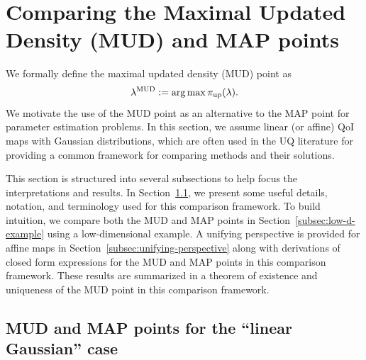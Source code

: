 \section{Comparing the Maximal Updated Density (MUD) and MAP points}\label{sec:estimation}

We formally define the maximal updated density (MUD) point as
\begin{equation}\label{eq:mudpt_inital_defn}
	\lambda^{\text{MUD}} := \operatorname*{arg\,max} {\operatorname*{\pi_{up}}}(\lambda).
\end{equation}
We motivate the use of the MUD point as an alternative to the MAP point for parameter estimation problems.
In this section, we assume linear (or affine) QoI maps with Gaussian distributions, which are often used in the UQ literature for providing a common framework for comparing methods and their solutions.

This section is structured into several subsections to help focus the interpretations and results.
In Section~\ref{subsec:Motivation}, we present some useful details, notation, and terminology used for this comparison framework.
To build intuition, we compare both the MUD and MAP points in Section~\ref{subsec:low-d-example} using a low-dimensional example.
A unifying perspective is provided for affine maps in Section~\ref{subsec:unifying-perspective} along with derivations of closed form expressions for the MUD and MAP points in this comparison framework.
These results are summarized in a theorem of existence and uniqueness of the MUD point in this comparison framework.


\subsection{MUD and MAP points for the ``linear Gaussian'' case}\label{subsec:Motivation}

